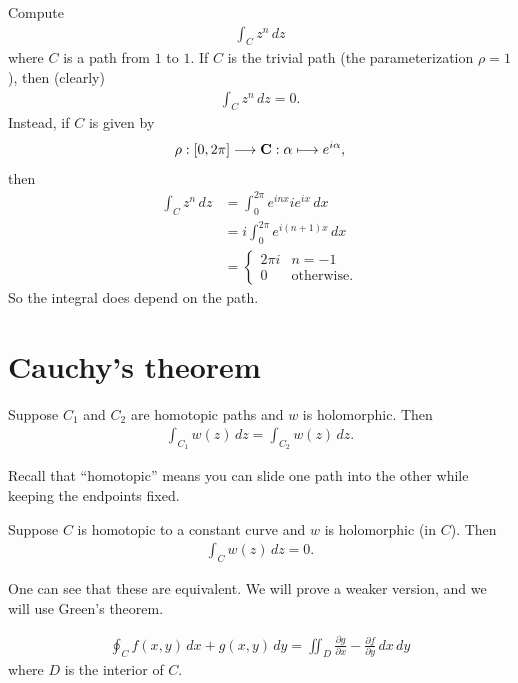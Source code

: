\documentclass[11pt, oneside,margin=1in]{article}
\begin{document}
\begin{example}[ ]\label{}\text{}
Compute
	\begin{align*}
	\int_{C}^{} z^n  \, dz 
\end{align*}
where $C$ is a path from $1$ to $1$. If $C$ is the trivial path (the parameterization $\rho=1$), then (clearly) 
\begin{align*}
	\int_{C}^{} z^n  \, dz = 0. 
\end{align*}
Instead, if $C$ is given by 
\begin{align*}
	\rho : [0,2\pi] \longrightarrow \mathbf C : \alpha \longmapsto e^{i\alpha},
\end{align*}
then
\begin{align*}
	\int_{C}^{} z^n  \, dz &= \int_{0}^{2\pi} e^{inx} i e^{ix}  \, dx\\
			       &= i \int_{0}^{2\pi} e^{i(n+1)x}  \, dx\\
			       &=
			       \begin{cases}
				       2\pi i & n=-1\\
				       0 &\textrm{otherwise}.
			       \end{cases}
\end{align*}
So the integral does depend on the path.
\end{example}

\section{Cauchy's theorem}
\begin{theorem}[Cauchy]\label{}\text{}
Suppose $C_1$ and $C_2$ are homotopic paths and $w$ is holomorphic. Then
\begin{align*}
	\int_{C_1}^{} w(z)  \, dz = \int_{C_2}^{} w(z)  \, dz.  
\end{align*}
\end{theorem}

Recall that ``homotopic'' means you can slide one path into the other while keeping the endpoints fixed. 
\begin{theorem}[Cauchy]\label{}\text{}
Suppose $C$ is homotopic to a constant curve and $w$ is holomorphic (in $C$). Then
\begin{align*}
	\int_{C}^{} w(z)  \, dz = 0. 
\end{align*}
\end{theorem}

One can see that these are equivalent. We will prove a weaker version, and we will use Green's theorem. 
\begin{theorem}[Green]\label{}\index{}\text{}
\begin{align*}
	\oint_C f(x,y)\,dx +  g (x,y) \, dy = \iint_D \frac{\partial g}{\partial x} - \frac{\partial f}{\partial y} \, dx\, dy
\end{align*}
where $D$ is the interior of $C$.
\end{theorem}
\end{document}
